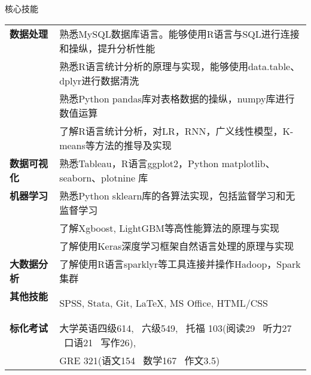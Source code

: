 \documentclass{resume} %
\begin{document}
\begin{rSection}{\noindent 核心技能}
\begin{tabular}{ @{} >{\bfseries}l @{\hspace{6ex}} l }

数据处理 \ & 熟悉MySQL数据库语言。能够使用R语言与SQL进行连接和操纵，提升分析性能 \\
         \ & 熟悉R语言统计分析的原理与实现，能够使用data.table、dplyr进行数据清洗 \\
         \ & 熟悉Python pandas库对表格数据的操纵，numpy库进行数值运算 \\
         \ & 了解R语言统计分析，对LR，RNN，广义线性模型，K-means等方法的推导及实现\\
         
数据可视化 \ & 熟悉Tableau，R语言ggplot2，Python matplotlib、seaborn、plotnine 库 \\
机器学习 \ & 熟悉Python sklearn库的各算法实现，包括监督学习和无监督学习\\
          \ & 了解Xgboost, LightGBM等高性能算法的原理与实现 \\
          \ & 了解使用Keras深度学习框架自然语言处理的原理与实现 \\
          
大数据分析 \ & 了解使用R语言sparklyr等工具连接并操作Hadoop，Spark集群 \\
其他技能 \ & SPSS, Stata, Git, \LaTeX, MS Office, HTML/CSS \\
标化考试 \ & 大学英语四级614, \ 六级549, \ 托福 103(阅读29 \ 听力27 \ 口语21 \ 写作26),\\
         \ & GRE 321(语文154 \ 数学167 \ 作文3.5) \\      
\end{tabular}
\end{rSection}
\end{document}

